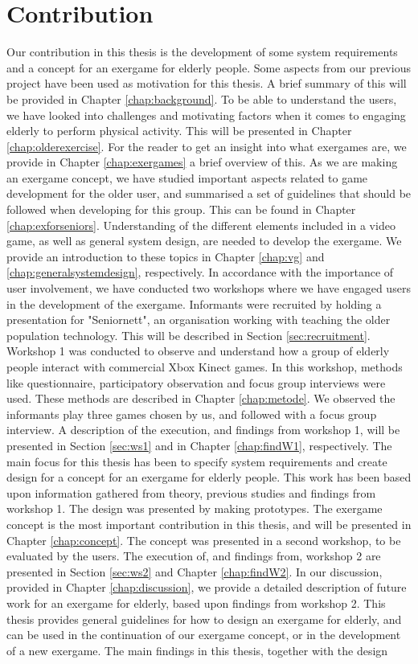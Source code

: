\section{Contribution}
Our contribution in this thesis is the development of some system requirements and a concept for an exergame for elderly people. Some aspects from our previous project \cite{project} have been used as motivation for this thesis. A brief summary of this will be provided in Chapter \ref{chap:background}. To be able to understand the users, we have looked into challenges and motivating factors when it comes to engaging elderly to perform physical activity. This will be presented in Chapter \ref{chap:olderexercise}. For the reader to get an insight into what exergames are, we provide in Chapter \ref{chap:exergames} a brief overview of this. As we are making an exergame concept, we have studied important aspects related to game development for the older user, and summarised a set of guidelines that should be followed when developing for this group. This can be found in Chapter \ref{chap:exforseniors}. Understanding of the different elements included in a video game, as well as general system design, are needed to develop the exergame. We provide an introduction to these topics in Chapter \ref{chap:vg} and \ref{chap:generalsystemdesign}, respectively. In accordance with the importance of user involvement, we have conducted two workshops where we have engaged users in the development of the exergame. Informants were recruited by holding a presentation for "Seniornett", an organisation working with teaching the older population technology. This will be described in Section \ref{sec:recruitment}. Workshop 1 was conducted to observe and understand how a group of elderly people interact with commercial Xbox Kinect games. In this workshop, methods like questionnaire, participatory observation and focus group interviews were used. These methods are described in Chapter \ref{chap:metode}. We observed the informants play three games chosen by us, and followed with a focus group interview. A description of the execution, and findings from workshop 1, will be presented in Section \ref{sec:ws1} and in Chapter \ref{chap:findW1}, respectively. The main focus for this thesis has been to specify system requirements and create design for a concept for an exergame for elderly people. This work has been based upon information gathered from theory, previous studies and findings from workshop 1. The design was presented by making prototypes. The exergame concept is the most important contribution in this thesis, and will be presented in Chapter \ref{chap:concept}. The concept was presented in a second workshop, to be evaluated by the users. The execution of, and findings from, workshop 2 are presented in Section \ref{sec:ws2} and Chapter \ref{chap:findW2}. In our discussion, provided in Chapter \ref{chap:discussion}, we provide a detailed description of future work for an exergame for elderly, based upon findings from workshop 2. This thesis provides general guidelines for how to design an exergame for elderly, and can be used in the continuation of our exergame concept, or in the development of a new exergame. The main findings in this thesis, together with the design 